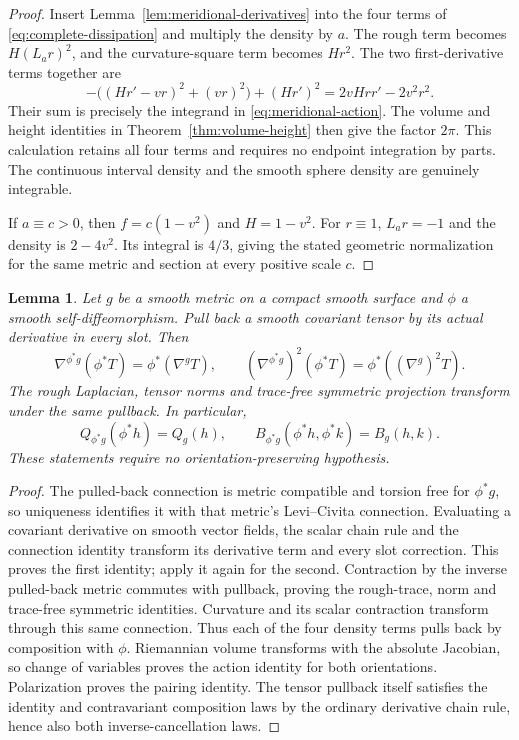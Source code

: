 \documentclass[11pt]{article}
\newtheorem{lemma}[theorem]{Lemma}
\begin{document}
\begin{proof}
Insert Lemma~\ref{lem:meridional-derivatives} into the four terms of
\eqref{eq:complete-dissipation} and multiply the density by $a$.
The rough term becomes $H(L_a r)^2$, and the curvature-square term
becomes $Hr^2$. The two first-derivative terms together are
\[
 -\bigl((Hr'-vr)^2+(vr)^2\bigr)+(Hr')^2
 =2vHrr'-2v^2r^2.
\]
Their sum is precisely the integrand in \eqref{eq:meridional-action}.
The volume and height identities in Theorem~\ref{thm:volume-height}
then give the factor $2\pi$. This calculation retains all four terms
and requires no endpoint integration by parts. The continuous interval
density and the smooth sphere density are genuinely integrable.

If $a\equiv c>0$, then $f=c(1-v^2)$ and $H=1-v^2$.
For $r\equiv1$, $L_a r=-1$ and the density is $2-4v^2$.
Its integral is $4/3$, giving the stated geometric normalization for
the same metric and section at every positive scale $c$.
\end{proof}

\begin{lemma}\label{lem:pullback-dissipation}
Let $g$ be a smooth metric on a compact smooth surface and $\phi$ a smooth
self-diffeomorphism. Pull back a smooth covariant tensor by its actual
derivative in every slot. Then
\[
 \nabla^{\phi^*g}(\phi^*T)=\phi^*(\nabla^g T),\qquad
 (\nabla^{\phi^*g})^2(\phi^*T)=\phi^*((\nabla^g)^2T).
\]
The rough Laplacian, tensor norms and trace-free symmetric projection
transform under the same pullback. In particular,
\[
 Q_{\phi^*g}(\phi^*h)=Q_g(h),\qquad
 B_{\phi^*g}(\phi^*h,\phi^*k)=B_g(h,k).
\]
These statements require no orientation-preserving hypothesis.
\end{lemma}

\begin{proof}
The pulled-back connection is metric compatible and torsion free for
$\phi^*g$, so uniqueness identifies it with that metric's Levi--Civita
connection. Evaluating a covariant derivative on smooth vector fields,
the scalar chain rule and the connection identity transform its derivative
term and every slot correction. This proves the first identity; apply it
again for the second. Contraction by the inverse pulled-back metric
commutes with pullback, proving the rough-trace, norm and trace-free
symmetric identities. Curvature and its scalar contraction transform
through this same connection. Thus each of the four density terms pulls
back by composition with $\phi$. Riemannian volume transforms with the
absolute Jacobian, so change of variables proves the action identity
for both orientations. Polarization proves the pairing identity.
The tensor pullback itself satisfies the identity and contravariant
composition laws by the ordinary derivative chain rule, hence also both
inverse-cancellation laws.
\end{proof}
\end{document}
